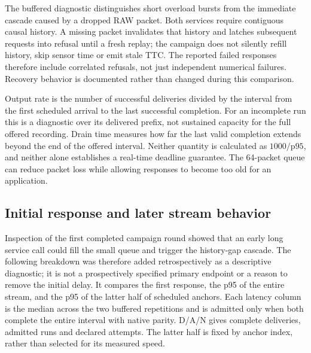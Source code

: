 The buffered diagnostic distinguishes short overload bursts from the immediate cascade caused by a dropped RAW packet. Both services require contiguous causal history. A missing packet invalidates that history and latches subsequent requests into refusal until a fresh replay; the campaign does not silently refill history, skip sensor time or emit stale TTC. The reported failed responses therefore include correlated refusals, not just independent numerical failures. Recovery behavior is documented rather than changed during this comparison.

Output rate is the number of successful deliveries divided by the interval from the first scheduled arrival to the last successful completion. For an incomplete run this is a diagnostic over its delivered prefix, not sustained capacity for the full offered recording. Drain time measures how far the last valid completion extends beyond the end of the offered interval. Neither quantity is calculated as $1000/\mathrm{p95}$, and neither alone establishes a real-time deadline guarantee. The 64-packet queue can reduce packet loss while allowing responses to become too old for an application.

\subsection{Initial response and later stream behavior}

Inspection of the first completed campaign round showed that an early long service call could fill the small queue and trigger the history-gap cascade. The following breakdown was therefore added retrospectively as a descriptive diagnostic; it is not a prospectively specified primary endpoint or a reason to remove the initial delay. It compares the first response, the p95 of the entire stream, and the p95 of the latter half of scheduled anchors. Each latency column is the median across the two buffered repetitions and is admitted only when both complete the entire interval with native parity. D/A/N gives complete deliveries, admitted runs and declared attempts. The latter half is fixed by anchor index, rather than selected for its measured speed.

\begin{table}[H]
\centering\small
\caption{\textbf{Retrospective initial/later response breakdown, in milliseconds.} Queue capacity 64. The later-window statistic retains its explicit subset definition and is not substituted for complete-stream latency or described as a guaranteed steady-state bound.}

\end{table}

